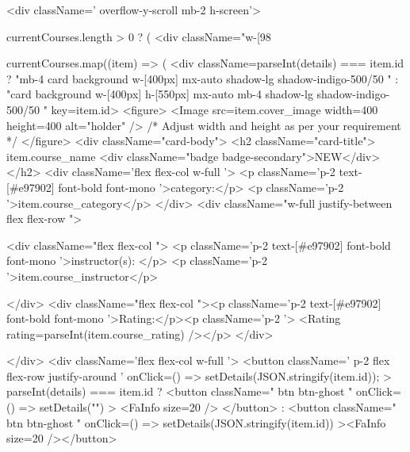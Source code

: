 <div className='  overflow-y-scroll  mb-2 h-screen'>
        {currentCourses.length > 0 ? (
          <div className="w-[98%
            {currentCourses.map((item) => (
              <div className={parseInt(details) === item.id ? "mb-4 card background w-[400px] mx-auto   shadow-lg shadow-indigo-500/50 " : "card background w-[400px] h-[550px] mx-auto  mb-4  shadow-lg shadow-indigo-500/50 "} key={item.id}>
                <figure>
                  <Image src={item.cover_image} width={400} height={400} alt="holder" /> {/* Adjust width and height as per your requirement */}
                </figure>
                <div className="card-body">
                  <h2 className="card-title">
                    {item.course_name}
                    <div className="badge badge-secondary">NEW</div>
                  </h2>
                  <div className='flex flex-col w-full '>
                    <p className='p-2 text-[#e97902] font-bold font-mono '>category:</p>
                    <p className='p-2 '>{item.course_category}</p>
                  </div>
                  <div className="w-full  justify-between flex flex-row ">

                    <div className="flex flex-col ">
                      <p className='p-2 text-[#e97902] font-bold font-mono '>instructor(s): </p>
                      <p className='p-2 '>{item.course_instructor}</p>

                    </div>
                    <div className="flex flex-col   "><p className='p-2 text-[#e97902] font-bold font-mono '>Rating:</p><p className='p-2 '> <Rating rating={parseInt(item.course_rating)} /></p> </div>

                  </div>
                  <div className='flex flex-col w-full  '>
                    <button className=' p-2 flex flex-row justify-around ' onClick={() => {
                      setDetails(JSON.stringify(item.id));
                    }}  >
                      {parseInt(details) === item.id ? <button className="  btn btn-ghost  " onClick={() => {
                        setDetails("")
                      }}>
                        <FaInfo size={20} />
                      </button> : <button className="  btn btn-ghost  " onClick={() => {
                        setDetails(JSON.stringify(item.id))
                      }}><FaInfo size={20} /></button>}

}}
